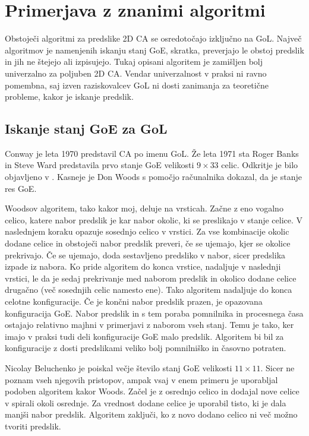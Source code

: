 \documentclass[12pt,a4paper,openany,twoside]{book}
\begin{document}
\chapter{Primerjava z znanimi algoritmi}

Obstoječi algoritmi za predslike 2D CA se osredotočajo izključno na GoL.
Največ algoritmov je namenjenih iskanju stanj GoE, skratka, preverjajo le
obstoj predslik in jih ne štejejo ali izpisujejo. Tukaj opisani algoritem
je zamišljen bolj univerzalno za poljuben 2D CA. Vendar univerzalnost v
praksi ni ravno pomembna, saj izven raziskovalcev GoL ni dosti zanimanja
za teoretične probleme, kakor je iskanje predslik.

\section{Iskanje stanj GoE za GoL}

Conway je leta 1970 predstavil CA po imenu GoL. Že leta 1971 sta Roger Banks in Steve Ward
predstavila prvo stanje GoE velikosti \(9 \times 33\) celic.
Odkritje je bilo objavljeno v \cite{Lifeline3}. Kasneje je Don Woods
\cite{Lifeline3, Lifeline4} s pomočjo računalnika dokazal, da je stanje res GoE.

Woodsov algoritem, tako kakor moj, deluje na vrsticah.
Začne z eno vogalno celico, katere nabor predslik je kar nabor okolic,
ki se preslikajo v stanje celice. V naslednjem koraku opazuje sosednjo celico v vrstici.
Za vse kombinacije okolic dodane celice in obstoječi nabor predslik preveri,
če se ujemajo, kjer se okolice prekrivajo. Če se ujemajo, doda sestavljeno predsliko v nabor,
sicer predslika izpade iz nabora. Ko pride algoritem do konca vrstice, nadaljuje v naslednji vrstici,
le da je sedaj prekrivanje med naborom predslik in okolico dodane celice drugačno (več sosednjih celic namesto ene).
Tako algoritem nadaljuje do konca celotne konfiguracije.
Če je končni nabor predslik prazen, je opazovana konfiguracija GoE.
Nabor predslik in s tem poraba pomnilnika in procesnega časa ostajajo
relativno majhni v primerjavi z naborom vseh stanj.
Temu je tako, ker imajo v praksi tudi deli konfiguracije GoE malo predslik.
Algoritem bi bil za konfiguracije z dosti predslikami veliko bolj pomnilniško in časovno potraten.

Nicolay Beluchenko je poiskal večje število stanj GoE velikosti \(11 \times 11\).
Sicer ne poznam vseh njegovih pristopov, ampak vsaj v enem primeru je uporabljal
podoben algoritem kakor Woods. Začel je z osrednjo celico in dodajal nove celice
v spirali okoli osrednje. Za vrednost dodane celice je uporabil tisto, ki je dala manjši nabor predslik.
Algoritem zaključi, ko z novo dodano celico ni več možno tvoriti predslik.
\end{document}
